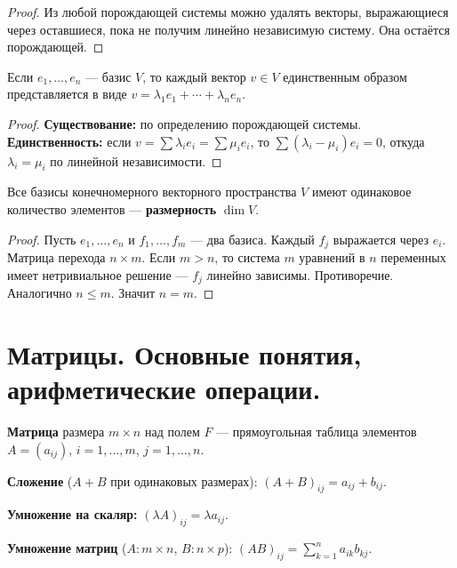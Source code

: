 \documentclass[12pt]{article}
\begin{document}
\begin{proof}
Из любой порождающей системы можно удалять векторы, выражающиеся
через оставшиеся, пока не получим линейно независимую систему.
Она остаётся порождающей.
\end{proof}

\begin{theorem}
Если $e_1,\ldots,e_n$ --- базис $V$, то каждый вектор $v \in V$
единственным образом представляется в виде
$v = \lambda_1 e_1 + \cdots + \lambda_n e_n$.
\end{theorem}

\begin{proof}
\textbf{Существование:} по определению порождающей системы.
\textbf{Единственность:} если $v = \sum \lambda_i e_i = \sum \mu_i e_i$,
то $\sum (\lambda_i - \mu_i) e_i = 0$, откуда $\lambda_i = \mu_i$ по
линейной независимости.
\end{proof}

\begin{theorem}
Все базисы конечномерного векторного пространства $V$ имеют
одинаковое количество элементов --- \textbf{размерность} $\dim V$.
\end{theorem}

\begin{proof}
Пусть $e_1,\ldots,e_n$ и $f_1,\ldots,f_m$ --- два базиса.
Каждый $f_j$ выражается через $e_i$. Матрица перехода $n\times m$.
Если $m > n$, то система $m$ уравнений в $n$ переменных имеет
нетривиальное решение --- $f_j$ линейно зависимы. Противоречие.
Аналогично $n \leq m$. Значит $n = m$.
\end{proof}

\section{Матрицы. Основные понятия, арифметические операции.}

\begin{definition}
\textbf{Матрица} размера $m \times n$ над полем $F$ ---
прямоугольная таблица элементов $A = (a_{ij})$,
$i = 1,\ldots,m$, $j = 1,\ldots,n$.
\end{definition}

\begin{definition}
\textbf{Сложение} ($A + B$ при одинаковых размерах):
$(A+B)_{ij} = a_{ij} + b_{ij}$.

\textbf{Умножение на скаляр:} $(\lambda A)_{ij} = \lambda a_{ij}$.

\textbf{Умножение матриц} ($A\colon m\times n$, $B\colon n\times p$):
$(AB)_{ij} = \sum_{k=1}^n a_{ik} b_{kj}$.
\end{definition}
\end{document}
